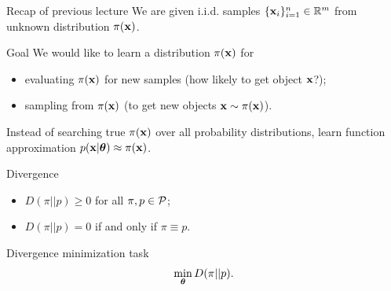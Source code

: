 

\usepackage{tikz}

\usetikzlibrary{arrows,shapes,positioning,shadows,trees}

\begin{frame}
\titlepage
\end{frame}
\begin{frame}{Recap of previous lecture}
	We are given i.i.d. samples $\{\mathbf{x}_i\}_{i=1}^n \in \mathbb{R}^m$ from unknown distribution $\pi(\mathbf{x})$.

	\begin{block}{Goal}
		We would like to learn a distribution $\pi(\mathbf{x})$ for 
		\begin{itemize}
		    \item evaluating $\pi(\mathbf{x})$ for new samples (how likely to get object $\mathbf{x}$?);
		    \item sampling from $\pi(\mathbf{x})$ (to get new objects $\mathbf{x} \sim \pi(\mathbf{x})$).
		\end{itemize}
	\end{block}
	Instead of searching true $\pi(\mathbf{x})$ over all probability distributions, learn function approximation $p(\mathbf{x} | \boldsymbol{\theta}) \approx \pi(\mathbf{x})$.
	\begin{block}{Divergence}
		\begin{itemize}
			\item $D(\pi || p) \geq 0$ for all $\pi, p \in \mathcal{P}$;
			\item $D(\pi || p) = 0$ if and only if $\pi \equiv p$.
		\end{itemize}
	\end{block}
	\begin{block}{Divergence minimization task}
		\vspace{-0.3cm}
		\[
		\min_{\boldsymbol{\theta}} D(\pi || p).
		\]
	\end{block}
\end{frame}
